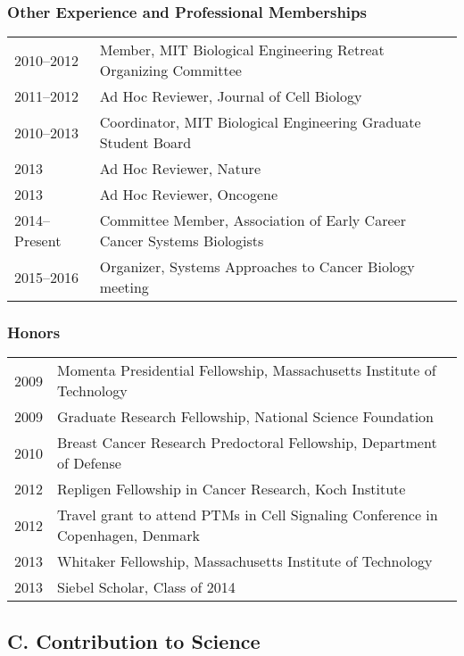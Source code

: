 \documentclass[11pt]{article}
\begin{document}
\subsubsection{Other Experience and Professional Memberships}

\begin{tabular}{p{1.1in}p{6.1in}}
2010--2012 & Member, MIT Biological Engineering Retreat Organizing Committee\\
2011--2012 & Ad Hoc Reviewer, Journal of Cell Biology\\
2010--2013 & Coordinator, MIT Biological Engineering Graduate Student Board\\
2013 & Ad Hoc Reviewer, Nature\\
2013 & Ad Hoc Reviewer, Oncogene\\
2014--Present & Committee Member, Association of Early Career Cancer Systems Biologists\\
2015--2016 & Organizer, Systems Approaches to Cancer Biology meeting\\
\end{tabular}


\subsubsection{Honors}

\begin{tabular}{p{1.1in}p{6.1in}}
 2009 & Momenta Presidential Fellowship, Massachusetts Institute of Technology\\
 2009 & Graduate Research Fellowship, National Science Foundation\\
 2010 & Breast Cancer Research Predoctoral Fellowship, Department of Defense\\
 2012 & Repligen Fellowship in Cancer Research, Koch Institute\\
 2012 & Travel grant to attend PTMs in Cell Signaling Conference in Copenhagen, Denmark\\
 2013 & Whitaker Fellowship, Massachusetts Institute of Technology\\
 2013 & Siebel Scholar, Class of 2014\\	
\end{tabular}





\subsection{C. Contribution to Science}
\end{document}
